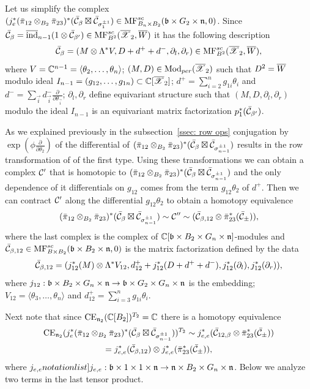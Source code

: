 \documentclass[10pt]{amsart}
\begin{document}
Let us simplify the complex $(j^*_{e}(\bar{\pi}_{12}\otimes_{B_2}\bar{\pi}_{23})^*(\bar{\mathcal{C}}_{\beta}\boxtimes\bar{\mathcal{C}}_{\sigma_{1}^{\pm 1}})\in \mathrm{MF}^{sc}_{B_n\times B_2}(\mathfrak{b}\times G_2\times\mathfrak{n},0)$.
Since $\bar{\mathcal{C}}_\beta=\overline{\mathrm{ind}}_{n-1}(1\otimes\bar{\mathcal{C}}_{\beta'})\in \mathrm{MF}^{sc}_{B^2}(\overline{\mathscr{X}}_2,\overline{W})$ it has the following description
$$\bar{\mathcal{C}}_\beta=(M\otimes\Lambda^* V,D+d^++d^-,\partial_l,\partial_r) \in \mathrm{MF}^{sc}_{B^2}(\overline{\mathscr{X}}_2,\overline{W}),$$
where $V=\mathbb{C}^{n-1}=\langle \theta_2,\dots,\theta_n\rangle$; $(M,D)\in \mathrm{Mod}_{per}(\overline{\mathscr{X}}_2)$ such that $D^2=\overline{W} $ modulo ideal $I_{n-1}=(g_{12},\dots, g_{1n})\subset \mathbb{C}[\overline{\mathscr{X}}_2]$;
$d^+=\sum_{i=2}^n g_{1i}\theta_i$ and $d^-=\sum_{\vec{i}} d^-_{\vec{i}}\frac{\partial}{\partial \theta_{\vec{i}}}$; $\partial_l,\partial_r$ define equivariant structure such that
$(M,D,\partial_l,\partial_r)$ modulo the ideal $I_{n-1}$ is an equivariant matrix factorization $p_1^*(\bar{\mathcal{C}}_{\beta'})$.

As we explained previously in the subsection~\ref{ssec: row ops} conjugation by $\exp(\phi\frac{\partial}{\partial\theta_2})$ of the differential of $(\bar{\pi}_{12}\otimes_{B_2}\bar{\pi}_{23})^*(\bar{\mathcal{C}}_{\beta}\boxtimes\bar{\mathcal{C}}_{\sigma_{n-1}^{\pm 1}})$
 results in the row transformation of
 of  the first type. Using these transformations we can obtain a complex $\mathcal{C}'$ that is homotopic to $(\bar{\pi}_{12}\otimes_{B_2}\bar{\pi}_{23})^*(\bar{\mathcal{C}}_{\beta}
 \boxtimes\bar{\mathcal{C}}_{\sigma_{n-1}^{\pm 1}}) $ and the only dependence of it differentials on  $g_{12}$
comes from the term $g_{12}\theta_2$ of $d^+$. Then we can contract $\mathcal{C}'$ along the differential $g_{12}\theta_2$ to obtain a homotopy equivalence
$$(\bar{\pi}_{12}\otimes_{B_2}\bar{\pi}_{23})^*(\bar{\mathcal{C}}_{\beta}
 \boxtimes\bar{\mathcal{C}}_{\sigma_{n-1}^{\pm 1}}) \sim\mathcal{C}''\sim (\bar{\mathcal{C}}_{\beta,12}\otimes \bar{\pi}_{23}^*(\bar{\mathcal{C}}_\pm)),$$
where the last complex is the complex of $\mathbb{C}[\mathfrak{b}\times B_2\times G_n\times \mathfrak{n}]$-modules and
$\bar{\mathcal{C}}_{\beta,12}\in \mathrm{MF}^{sc}_{B\times B_2}(\mathfrak{b}\times B_2\times \mathfrak{n},0)$ is the matrix factorization defined by the data
$$\bar{\mathcal{C}}_{\beta,12}=(j_{12}^*(M)\otimes\Lambda^* V_{12},d^+_{12}+j^*_{12}(D+d^++d^-),j^*_{12}(\partial_l),j^*_{12}(\partial_r)),$$
where $j_{12}:\mathfrak{b}\times B_2\times G_n\times\mathfrak{n}\to \mathfrak{b} \times G_2\times G_n\times \mathfrak{n}$ is the embedding; $V_{12}=\langle \theta_3,\dots, \theta_n\rangle$ and
$d^+_{12}=\sum_{i=3}^n g_{1i}\theta_i$.


Next note that since $\mathrm{CE}_{\mathfrak{n}_2}(\mathbb{C}[B_2])^{T_2}=\mathbb{C}$ there is a homotopy equivalence
\begin{multline*} \mathrm{CE}_{\mathfrak{n}_2}( j^*_{e}(\bar{\pi}_{12}\otimes_{B_2}\bar{\pi}_{23})^*(\bar{\mathcal{C}}_{\beta}\boxtimes\bar{\mathcal{C}}_{\sigma_{n-1}^{\pm 1}}))^{T_2}\sim
  j_{e,e}^*(\bar{\mathcal{C}}_{12,\beta}\otimes \bar{\pi}^*_{23}(\bar{\mathcal{C}}_{\pm}))\\=j_{e,e}^*(\bar{\mathcal{C}}_{\beta,12})\otimes j_{e,e}^*(\bar{\pi}^*_{23}(\bar{\mathcal{C}}_{\pm})),
  \end{multline*}
where $\SymbolPrint{j_{e,e}}: \frb\times 1\times 1\times \frn\to \frn\times B_2\times G_n\times \frn$.
Below we analyze two terms in the last tensor product.
\end{document}
